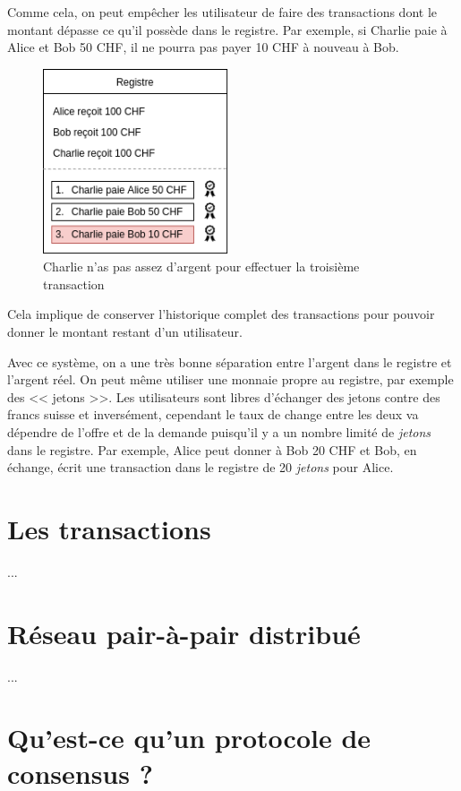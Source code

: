 Comme cela, on peut empêcher les utilisateur de faire des transactions dont le montant dépasse ce qu'il possède dans le registre. Par exemple, si Charlie paie à Alice et Bob 50 CHF, il ne pourra pas payer 10 CHF à nouveau à Bob.

\begin{figure}[H]
  \centering
  \includegraphics[width=5.5cm]{images/crypto_7.png}
  \caption{Charlie n'as pas assez d'argent pour effectuer la troisième transaction}
\end{figure}

Cela implique de conserver l'historique complet des transactions pour pouvoir donner le montant restant d'un utilisateur.

Avec ce système, on a une très bonne séparation entre l'argent dans le registre et l'argent réel. On peut même utiliser une monnaie propre au registre, par exemple des << jetons >>. Les utilisateurs sont libres d'échanger des jetons contre des francs suisse et inversément, cependant le taux de change entre les deux va dépendre de l'offre et de la demande puisqu'il y a un nombre limité de \emph{jetons} dans le registre. Par exemple, Alice peut donner à Bob 20 CHF et Bob, en échange, écrit une transaction dans le registre de 20 \emph{jetons} pour Alice.


\section{Les transactions}

...

\section{Réseau pair-à-pair distribué}

...

\section{Qu'est-ce qu'un protocole de consensus ?}

